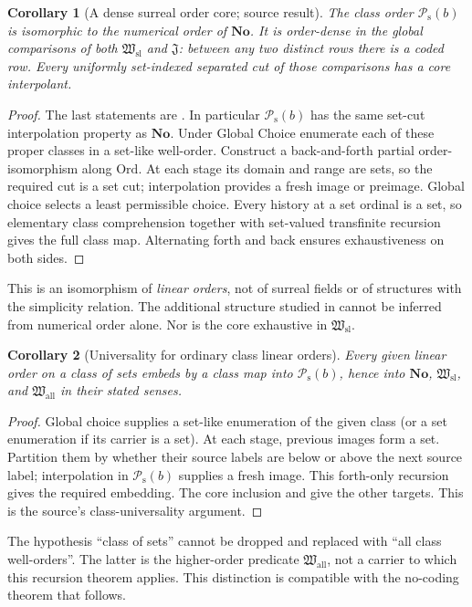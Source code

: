 \documentclass[11pt]{article}
\newtheorem{corollary}[corollary]{Corollary}
\theoremstyle{definition}
\theoremstyle{remark}
\newcommand{\No}{\mathbf{No}}
\newcommand{\Ord}{\mathrm{Ord}}
\newcommand{\Hsl}{\mathfrak W_{\mathrm{sl}}}
\newcommand{\Hall}{\mathfrak W_{\mathrm{all}}}
\newcommand{\Jinj}{\mathfrak J}
\newcommand{\Psupp}{\mathcal P_{\mathrm{s}}}
\begin{document}
\begin{corollary}[A dense surreal order core; source result]
\label{swo:gs:cor:core-isomorphism}
The class order $\Psupp(b)$ is isomorphic to the numerical order of $\No$.
It is order-dense in the global comparisons of both $\Hsl$ and $\Jinj$:
between any two distinct rows there is a coded row. Every uniformly
set-indexed separated cut of those comparisons has a core interpolant.
\end{corollary}
\begin{proof}
The last statements are . In particular
$\Psupp(b)$ has the same set-cut interpolation property as $\No$. Under
Global Choice enumerate each of these proper classes in a set-like
well-order. Construct a back-and-forth partial order-isomorphism along
$\Ord$. At each stage its domain and range are sets, so the required
cut is a set cut; interpolation provides a fresh image or preimage.
Global choice selects a least permissible choice. Every history at a
set ordinal is a set, so elementary class comprehension together with
set-valued transfinite recursion gives the full class map. Alternating
forth and back ensures exhaustiveness on both sides.
\end{proof}

This is an isomorphism of \emph{linear orders}, not of surreal fields or
of structures with the simplicity relation. The additional structure
studied in \cite{BagayokoHoeven} cannot be inferred from numerical order
alone. Nor is the core exhaustive in $\Hsl$.

\begin{corollary}[Universality for ordinary class linear orders]
\label{swo:gs:cor:class-universality}
Every given linear order on a class of sets embeds by a class map into
$\Psupp(b)$, hence into $\No$, $\Hsl$, and $\Hall$ in their stated senses.
\end{corollary}
\begin{proof}
Global choice supplies a set-like enumeration of the given class
(or a set enumeration if its carrier is a set). At each stage, previous
images form a set. Partition them by whether their source labels are
below or above the next source label; interpolation in $\Psupp(b)$ supplies
a fresh image. This forth-only recursion gives the required embedding.
The core inclusion and  give the other
targets. This is the source's class-universality argument.
\end{proof}

The hypothesis ``class of sets'' cannot be dropped and replaced with
``all class well-orders''. The latter is the higher-order predicate
$\Hall$, not a carrier to which this recursion theorem applies.
This distinction is compatible with the no-coding theorem that follows.
\end{document}
